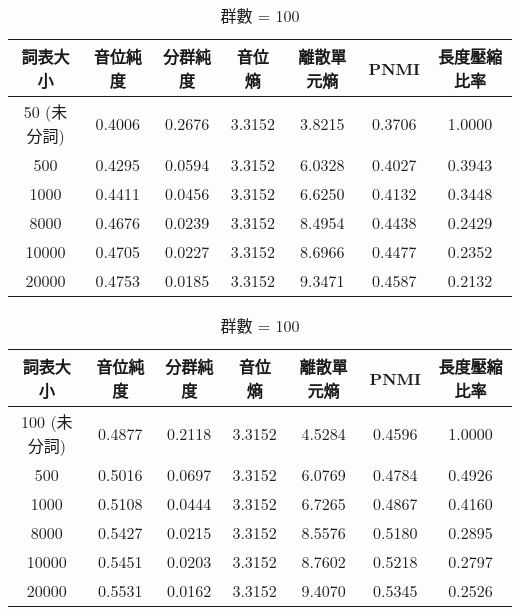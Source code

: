 \begin{table}[!htbp]
    \centering
    \begin{subtable}[t]{\textwidth}
        \centering
        \begin{tabular}{|c|c|c|c|c|c|c|} \hline 
                詞表大小  & 音位純度 & 分群純度 & 音位熵 & 離散單元熵 &    PNMI & 長度壓縮比率 \\ \hline 
 50 (未分詞)&  0.4006 &   0.2676 & 3.3152 &     3.8215 & 0.3706&1.0000\\ \hline 
                  500  &   0.4295&     0.0594    &3.3152 &   6.0328  &       0.4027 &0.3943 \\ \hline %
                 1000  &   0.4411&     0.0456    &3.3152 &   6.6250  &       0.4132 &0.3448 \\ \hline %
                 8000  &   0.4676&     0.0239    &3.3152 &   8.4954  &       0.4438 &0.2429 \\ \hline %
                10000  &   0.4705&     0.0227    &3.3152 &   8.6966  &       0.4477 &0.2352 \\ \hline %
                20000  &   0.4753&     0.0185    &3.3152 &   9.3471  &       0.4587 &0.2132 \\ \hline %
        \end{tabular}
\caption{群數 = 50}
        \label{tab:ch4-w2v2-phn-clu050}
    \end{subtable}        

    \jefftablesep        

    \begin{subtable}[t]{\textwidth}
        \centering
        \begin{tabular}{|c|c|c|c|c|c|c|} \hline 
                詞表大小  & 音位純度 & 分群純度 & 音位熵 & 離散單元熵 &    PNMI & 長度壓縮比率 \\ \hline 
 100 (未分詞)&0.4877 &   0.2118 & 3.3152 &     4.5284 & 0.4596&1.0000\\ \hline 
                  500  &   0.5016&     0.0697    &3.3152 &   6.0769  &       0.4784 &0.4926 \\ \hline %
                 1000  &   0.5108&     0.0444    &3.3152 &   6.7265  &       0.4867 &0.4160 \\ \hline %
                 8000  &   0.5427&     0.0215    &3.3152 &   8.5576  &       0.5180 &0.2895 \\ \hline %
                10000  &   0.5451&     0.0203    &3.3152 &   8.7602  &       0.5218 &0.2797 \\ \hline %
                20000  &   0.5531&     0.0162    &3.3152 &   9.4070  &       0.5345 &0.2526 \\ \hline %
        \end{tabular}
\caption{群數 = 100}
        \label{tab:ch4-w2v2-phn-clu100}
    \end{subtable}        


\end{table}
